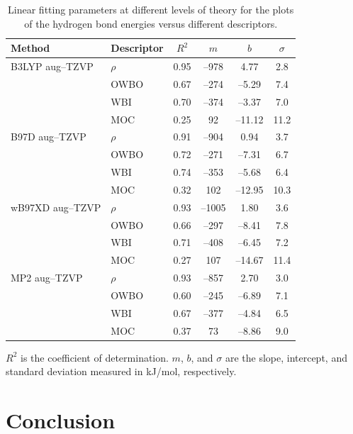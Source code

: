 \documentclass[11pt]{report}
\begin{document}
\begin{table}
 \centering
 \caption[Linear fitting parameters at different levels of theory]{Linear fitting parameters at different levels of theory for the plots of the hydrogen bond energies versus different descriptors.}
  \label{t:HBP-statall}
 \begin{tabular*}{\linewidth}{@{\extracolsep{\fill}}llcccc}
\toprule
 Method & Descriptor & $R^{2}$ & $m$  & $b$  & $\sigma$ \\
\midrule
 B3LYP aug--TZVP & $\rho$ & 0.95	& --978	& 4.77    & 2.8 \\
 & OWBO	& 0.67	& --274	& --5.29  & 7.4 \\
 & WBI	& 0.70	& --374 & --3.37  & 7.0 \\
 & MOC	& 0.25	& 92 & --11.12 & 11.2\\
 B97D aug--TZVP & $\rho$ & 0.91	& --904	& 0.94 & 3.7 \\
 & OWBO	& 0.72	& --271	& --7.31  & 6.7 \\
 & WBI	& 0.74	& --353 & --5.68  & 6.4 \\
 & MOC	& 0.32	& 102 & --12.95 & 10.3\\
  wB97XD aug--TZVP & $\rho$ & 0.93  & --1005	& 1.80 & 3.6 \\
 & OWBO	& 0.66	& --297	& --8.41  & 7.8 \\
 & WBI	& 0.71	& --408 & --6.45  & 7.2 \\
 & MOC	& 0.27	& 107 & --14.67 & 11.4\\
  MP2 aug--TZVP & $\rho$ & 0.93  & --857	& 2.70 & 3.0 \\
 & OWBO	& 0.60	& --245	& --6.89  & 7.1 \\
 & WBI	& 0.67	& --377 & --4.84  & 6.5 \\
 & MOC	& 0.37	& 73 & --8.86 & 9.0\\
  \bottomrule
 \end{tabular*}
 \vspace{-0.45cm}
 \begin{flushleft}
	$R^{2}$ is the coefficient of determination. $m$, $b$, and $\sigma$ are the slope, intercept, and standard deviation measured in kJ/mol, respectively.
 \end{flushleft}
\end{table}

\section{Conclusion}
\label{s:HBP-Conclusion}
\end{document}
